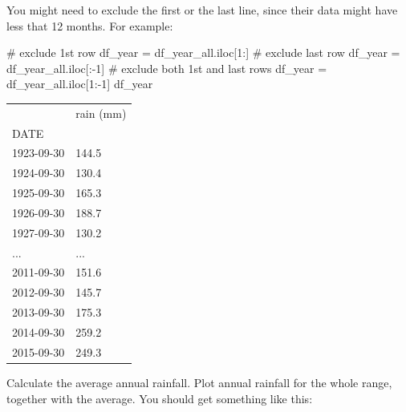 \documentclass[
  letterpaper,
  DIV=11,
  numbers=noendperiod]{scrreprt}
\newenvironment{Shaded}{\begin{snugshade}}{\end{snugshade}}
\newcommand{\CommentTok}[1]{\textcolor[rgb]{0.37,0.37,0.37}{#1}}
\newcommand{\DecValTok}[1]{\textcolor[rgb]{0.68,0.00,0.00}{#1}}
\newcommand{\NormalTok}[1]{\textcolor[rgb]{0.00,0.23,0.31}{#1}}
\newcommand{\OperatorTok}[1]{\textcolor[rgb]{0.37,0.37,0.37}{#1}}
\begin{document}
You might need to exclude the first or the last line, since their data
might have less that 12 months. For example:

\begin{Shaded}
\begin{Highlighting}[]
\CommentTok{\# exclude 1st row}
\NormalTok{df\_year }\OperatorTok{=}\NormalTok{ df\_year\_all.iloc[}\DecValTok{1}\NormalTok{:]}
\CommentTok{\# exclude last row}
\NormalTok{df\_year }\OperatorTok{=}\NormalTok{ df\_year\_all.iloc[:}\OperatorTok{{-}}\DecValTok{1}\NormalTok{]}
\CommentTok{\# exclude both 1st and last rows}
\NormalTok{df\_year }\OperatorTok{=}\NormalTok{ df\_year\_all.iloc[}\DecValTok{1}\NormalTok{:}\OperatorTok{{-}}\DecValTok{1}\NormalTok{]}
\NormalTok{df\_year}
\end{Highlighting}
\end{Shaded}

\begin{longtable}[]{@{}ll@{}}
\toprule()
& rain (mm) \\
DATE & \\
\midrule()
\endhead
1923-09-30 & 144.5 \\
1924-09-30 & 130.4 \\
1925-09-30 & 165.3 \\
1926-09-30 & 188.7 \\
1927-09-30 & 130.2 \\
... & ... \\
2011-09-30 & 151.6 \\
2012-09-30 & 145.7 \\
2013-09-30 & 175.3 \\
2014-09-30 & 259.2 \\
2015-09-30 & 249.3 \\
\bottomrule()
\end{longtable}

Calculate the average annual rainfall. Plot annual rainfall for the
whole range, together with the average. You should get something like
this:
\end{document}
